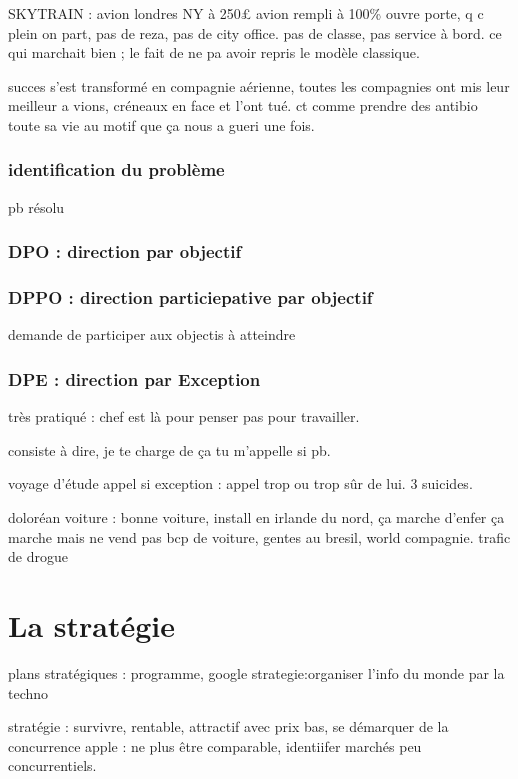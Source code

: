 \documentclass[a4paper,12pt]{article}
\begin{document}
 SKYTRAIN : avion londres NY à 250£ 
 avion rempli à 100\% ouvre porte, q c plein on part, pas de reza, pas de city office.
 pas de classe, pas service à bord.
 ce qui marchait bien ; le fait de ne pa avoir repris le modèle classique.
 
 succes s'est transformé en compagnie aérienne, toutes les compagnies ont mis leur meilleur a	vions, créneaux en face
 et l'ont tué.  
 ct comme prendre des antibio toute sa vie au motif que ça nous a gueri une fois.
 
 \subsubsection{identification du problème}
 
 pb résolu 
  \subsubsection{DPO  : direction par objectif}

  \subsubsection{ DPPO : direction particiepative par objectif}
demande de participer aux objectis à atteindre
 \subsubsection{DPE : direction par Exception}
 
 très pratiqué : chef est là pour penser pas pour travailler.
 
 consiste à dire, je te charge de ça tu m'appelle si pb.
 
 voyage d'étude appel si exception : appel trop ou trop sûr de lui.
 3 suicides.
 
 doloréan voiture : bonne voiture, install en irlande du nord, ça marche d'enfer
 ça marche mais ne vend pas bcp de voiture, gentes au bresil, world compagnie.
 trafic de drogue
 
 \section{La stratégie}
 
 plans stratégiques : programme, google strategie:organiser l'info du monde par la techno
 
 stratégie : survivre, rentable, attractif avec prix bas, se démarquer de la concurrence apple : ne plus être
 comparable, identiifer marchés peu concurrentiels.
 
\end{document}
